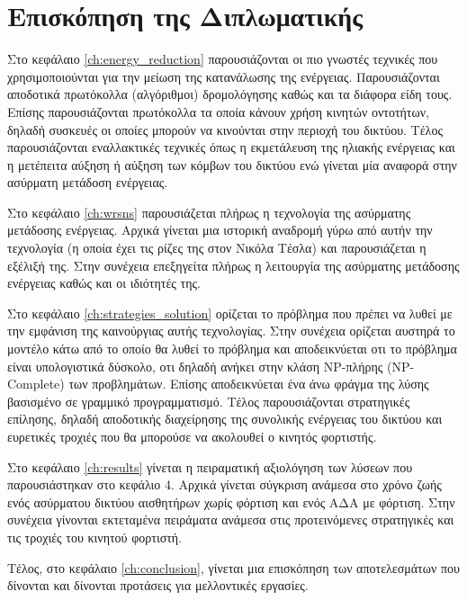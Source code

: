 \section{Επισκόπηση της Διπλωματικής}
Στο κεφάλαιο \ref{ch:energy_reduction} παρουσιάζονται οι πιο γνωστές τεχνικές που χρησιμοποιούνται για την μείωση της κατανάλωσης της ενέργειας. Παρουσιάζονται
αποδοτικά πρωτόκολλα (αλγόριθμοι) δρομολόγησης καθώς και τα διάφορα είδη τους. Επίσης παρουσιάζονται πρωτόκολλα τα οποία κάνουν χρήση κινητών οντοτήτων, δηλαδή
συσκευές οι οποίες μπορούν να κινούνται στην περιοχή του δικτύου. Τέλος παρουσιάζονται εναλλακτικές τεχνικές όπως η εκμετάλευση της ηλιακής ενέργειας και η μετέπειτα
αύξηση ή αύξηση των κόμβων του δικτύου ενώ γίνεται μία αναφορά στην ασύρματη μετάδοση ενέργειας.

Στο κεφάλαιο \ref{ch:wrsns} παρουσιάζεται πλήρως η τεχνολογία της ασύρματης μετάδοσης ενέργειας. Αρχικά γίνεται μια ιστορική αναδρομή γύρω από αυτήν την τεχνολογία (η
οποία έχει τις ρίζες της στον Νικόλα Τέσλα) και παρουσιάζεται η εξέλιξή της. Στην συνέχεια επεξηγείτα πλήρως η λειτουργία της ασύρματης μετάδοσης ενέργειας καθώς και
οι ιδιότητές της.

Στο κεφάλαιο \ref{ch:strategies_solution} ορίζεται το πρόβλημα που πρέπει να λυθεί με την εμφάνιση της καινούργιας αυτής τεχνολογίας. Στην συνέχεια ορίζεται αυστηρά
το μοντέλο κάτω από το οποίο θα λυθεί το πρόβλημα και αποδεικνύεται οτι το πρόβλημα είναι υπολογιστικά δύσκολο, οτι δηλαδή ανήκει στην κλάση NP-πλήρης (NP-Complete)
των προβλημάτων. Επίσης αποδεικνύεται ένα άνω φράγμα της λύσης βασισμένο σε γραμμικό προγραμματισμό. Τέλος παρουσιάζονται στρατηγικές επίλησης, δηλαδή αποδοτικής
διαχείρησης της συνολικής ενέργειας του δικτύου και ευρετικές τροχιές που θα μπορούσε να ακολουθεί ο κινητός φορτιστής.

Στο κεφάλαιο \ref{ch:results} γίνεται η πειραματική αξιολόγηση των λύσεων που παρουσιάστηκαν στο κεφάλιο 4. Αρχικά γίνεται σύγκριση ανάμεσα στο χρόνο ζωής ενός
ασύρματου δικτύου αισθητήρων χωρίς φόρτιση και ενός ΑΔΑ με φόρτιση. Στην συνέχεια γίνονται εκτεταμένα πειράματα ανάμεσα στις προτεινόμενες στρατηγικές και τις τροχιές
του κινητού φορτιστή.

Τέλος, στο κεφάλαιο \ref{ch:conclusion}, γίνεται μια επισκόπηση των αποτελεσμάτων που δίνονται και δίνονται προτάσεις για μελλοντικές εργασίες.


\label{ch:wsns}